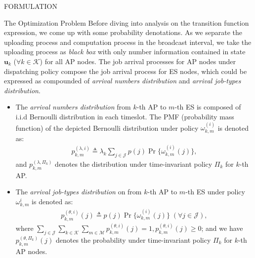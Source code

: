 \documentclass[10pt, conference, letterpaper]{IEEEtran}
\newcommand{\define}{\triangleq}
\renewcommand{\vec}{\mathbf}
\newcommand{\apSet}{\mathcal{K}}
\newcommand{\esSet}{\mathcal{M}}
\newcommand{\jSpace}{\mathcal{J}}
\begin{document}
\begin{section}{FORMULATION}
\begin{subsection}{The Optimization Problem}
            Before diving into analysis on the transition function expression, we come up with some probability denotations. As we separate the uploading process and computation process in the broadcast interval, we take the uploading process as \emph{black box} with only number information contained in state $\vec{u}_k$ ($\forall k\in\apSet$) for all AP nodes. The job arrival processes for AP nodes under dispatching policy compose the job arrival process for ES nodes, which could be expressed as compounded of \emph{arrival numbers distribution} and \emph{arrival job-types distribution}.
            \begin{itemize}
                \item
                    The \emph{arrival numbers distribution} from $k$-th AP to $m$-th ES is composed of i.i.d Bernoulli distribution in each timeslot. The PMF (probability mass function) of the depicted Bernoulli distribution under policy $\omega^{(i)}_{k,m}$ is denoted as:
                    \begin{align}
                        p^{(\lambda,i)}_{k,m} \define \lambda_k \sum_{j\in\jSpace} p(j) \Pr\{\omega^{(i)}_{k,m}(j)\},
                    \end{align}
                    and $p^{(\lambda,\Pi_k)}_{k,m}$ denotes the distribution under time-invariant policy $\Pi_{k}$ for $k$-th AP.
                \item
                    The \emph{arrival job-types distribution} on from $k$-th AP to $m$-th ES under policy $\omega^{i}_{k,m}$ is denoted as:
                    \begin{align}
                        p^{(\theta, i)}_{k,m}(j) \define p(j) \Pr\{\omega^{(i)}_{k,m}(j)\}\;(\forall j\in\jSpace),
                    \end{align}
                    where $\sum_{j\in\jSpace}\sum_{k\in\apSet}\sum_{m\in\esSet} p^{(\theta, i)}_{k,m}(j)=1, p^{(\theta, i)}_{k,m}(j) \geq 0$; and we have $p^{(\theta,\Pi_k)}_{k,m}(j)$ denotes the probability under time-invariant policy $\Pi_k$ for $k$-th AP nodes.
            \end{itemize}
            

\end{subsection}
\end{section}
\end{document}
